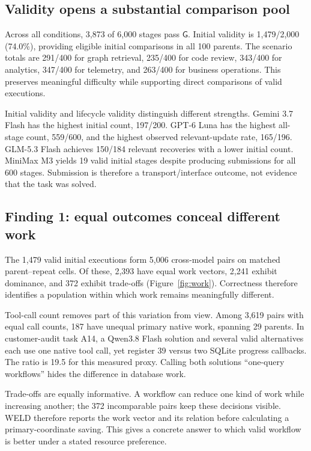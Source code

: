 \documentclass[11pt]{article}
\newcommand{\G}{\mathsf{G}}
\begin{document}
\subsection{Validity opens a substantial comparison pool}

Across all conditions, 3,873 of 6,000 stages pass $\G$. Initial validity is 1,479/2,000 (74.0\%), providing eligible initial comparisons in all 100 parents. The scenario totals are 291/400 for graph retrieval, 235/400 for code review, 343/400 for analytics, 347/400 for telemetry, and 263/400 for business operations. This preserves meaningful difficulty while supporting direct comparisons of valid executions.

Initial validity and lifecycle validity distinguish different strengths. Gemini 3.7 Flash has the highest initial count, 197/200. GPT-6 Luna has the highest all-stage count, 559/600, and the highest observed relevant-update rate, 165/196. GLM-5.3 Flash achieves 150/184 relevant recoveries with a lower initial count. MiniMax M3 yields 19 valid initial stages despite producing submissions for all 600 stages. Submission is therefore a transport/interface outcome, not evidence that the task was solved.

\subsection{Finding 1: equal outcomes conceal different work}

The 1,479 valid initial executions form 5,006 cross-model pairs on matched parent--repeat cells. Of these, 2,393 have equal work vectors, 2,241 exhibit dominance, and 372 exhibit trade-offs (Figure~\ref{fig:work}). Correctness therefore identifies a population within which work remains meaningfully different.

Tool-call count removes part of this variation from view. Among 3,619 pairs with equal call counts, 187 have unequal primary native work, spanning 29 parents. In customer-audit task A14, a Qwen3.8 Flash solution and several valid alternatives each use one native tool call, yet register 39 versus two SQLite progress callbacks. The ratio is 19.5 for this measured proxy. Calling both solutions ``one-query workflows'' hides the difference in database work.

Trade-offs are equally informative. A workflow can reduce one kind of work while increasing another; the 372 incomparable pairs keep these decisions visible. WELD therefore reports the work vector and its relation before calculating a primary-coordinate saving. This gives a concrete answer to which valid workflow is better under a stated resource preference.
\end{document}
